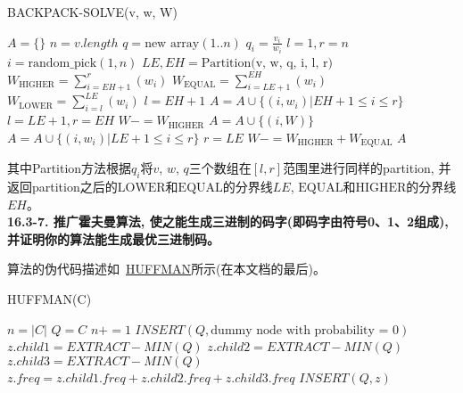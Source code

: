 \documentclass[paper=a4, fontsize=11pt]{scrartcl} %
\numberwithin{equation}{section} %
\numberwithin{figure}{section} %
\numberwithin{table}{section} %
\begin{document}
\begin{algorithm}[ht]
  \caption{BACKPACK-SOLVE(v, w, W)}
  \label{algo:backpack}
  \begin{algorithmic}[1]
    \State $A = \{\}$
    \State $n = v.length$
    \State $q = \mbox{new array}(1..n)$
    \State $q_i = \frac{v_i}{w_i}$
    \EndFor
    \State $l = 1, r = n$
    \State $i = \mbox{random\_pick}(1, n)$
    \State $LE, EH = \mbox{Partition(v, w, q, i, l, r)}$ 
    \State $W_{\mbox{HIGHER}} = \sum_{i=EH+1}^{r}(w_i)$
    \State $W_{\mbox{EQUAL}} = \sum_{i=LE+1}^{EH}(w_i)$
    \State $W_{\mbox{LOWER}} = \sum_{i=l}^{LE}(w_i)$
    \State $l = EH + 1$
    \State $A = A \cup \{(i, w_i) | EH + 1 \leq i \leq r\}$
    \State $l = LE + 1, r = EH$
    \State $W -= W_{\mbox{HIGHER}}$
     
    \State $A = A \cup \{(i, W)\}$
    \State\Break
    \EndIf
    \Else
    \State $A = A \cup \{(i, w_i) | LE + 1 \leq i \leq r\}$
    \State $r = LE$
    \State $W -= W_{\mbox{HIGHER}} + W_{\mbox{EQUAL}}$
    \EndIf
    \EndWhile
    \State\Return $A$
  \end{algorithmic}
\end{algorithm}

其中Partition方法根据$q_i$将$v$, $w$, $q$三个数组在$[l, r]$范围里进行同样的partition, 并返回partition之后的$\mbox{LOWER}$和$\mbox{EQUAL}$的分界线$LE$, $\mbox{EQUAL}$和$\mbox{HIGHER}$的分界线$EH$。
\\[4ex]

\textbf{16.3-7. 推广霍夫曼算法, 使之能生成三进制的码字(即码字由符号0、1、2组成), 并证明你的算法能生成最优三进制码。}

算法的伪代码描述如~\hyperref[algo:huffman]{HUFFMAN}所示(在本文档的最后)。
\begin{algorithm}[ht]
  \caption{HUFFMAN(C)}
  \label{algo:huffman}
  \begin{algorithmic}[1]
    \State $n = |C|$
    \State $Q = C$
    \State $n += 1$
    \State $INSERT(Q, \mbox{dummy node with probability = 0})$
    \EndIf
    \State $z.child1 = EXTRACT-MIN(Q)$
    \State $z.child2 =  EXTRACT-MIN(Q)$
    \State $z.child3 = EXTRACT-MIN(Q)$
    \State $z.freq = z.child1.freq + z.child2.freq + z.child3.freq$
    \State $INSERT(Q, z)$
    \EndWhile
  \end{algorithmic}
\end{algorithm}
\end{document}
